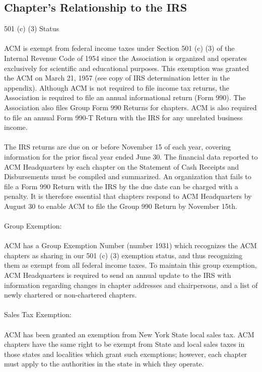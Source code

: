 \subsection{Chapter's Relationship to the IRS}
501 (c) (3) Status
\\
\\
ACM is exempt from federal income taxes under Section 501 (c) (3) of the Internal
Revenue Code of 1954 since the Association is organized and operates exclusively
for scientific and educational purposes. This exemption was granted the ACM on
March 21, 1957 (see copy of IRS determination letter in the appendix). Although
ACM is not required to file income tax returns, the Association is required to
file an annual informational return (Form 990). The Association also files Group
Form 990 Returns for chapters. ACM is also required to file an annual Form 990-T
Return with the IRS for any unrelated business income.
\\
\\
The IRS returns are due on or before November 15 of each year, covering
information for the prior fiscal year ended June 30. The financial data reported
to ACM Headquarters by each chapter on the Statement of Cash Receipts and
Disbursements must be compiled and summarized. An organization that fails to file
a Form 990 Return with the IRS by the due date can be charged with a penalty. It
is therefore essential that chapters respond to ACM Headquarters by August 30 to
enable ACM to file the Group 990 Return by November 15th.
\\
\\
Group Exemption:
\\
\\
ACM has a Group Exemption Number (number 1931) which recognizes the ACM chapters
as sharing in our 501 (c) (3) exemption status, and thus recognizing them as
exempt from all federal income taxes. To maintain this group exemption, ACM
Headquarters is required to send an annual update to the IRS with information
regarding changes in chapter addresses and chairpersons, and a list of newly
chartered or non-chartered chapters.
\\
\\
Sales Tax Exemption:
\\
\\
ACM has been granted an exemption from New York State local sales tax. ACM
chapters have the same right to be exempt from State and local sales taxes
in those states and localities which grant such exemptions; however, each
chapter must apply to the authorities in the state in which they operate.
